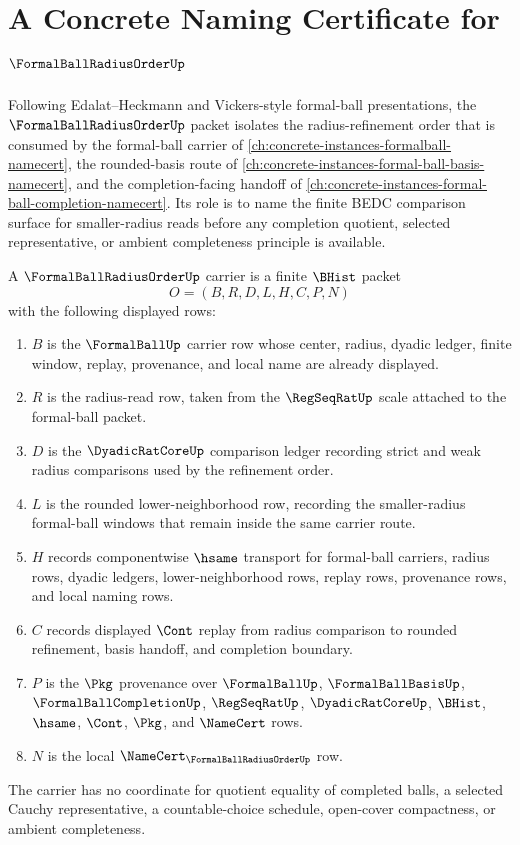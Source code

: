 \chapter{A Concrete Naming Certificate for $\FormalBallRadiusOrderUp$}
\label{ch:concrete-instances-formal-ball-radius-order-namecert}

Following Edalat--Heckmann and Vickers-style formal-ball presentations, the $\FormalBallRadiusOrderUp$ packet isolates the radius-refinement order that is consumed by the formal-ball carrier of \autoref{ch:concrete-instances-formalball-namecert}, the rounded-basis route of \autoref{ch:concrete-instances-formal-ball-basis-namecert}, and the completion-facing handoff of \autoref{ch:concrete-instances-formal-ball-completion-namecert}. Its role is to name the finite BEDC comparison surface for smaller-radius reads before any completion quotient, selected representative, or ambient completeness principle is available.

\begin{definition}
\label{def:formal-ball-radius-order}
A $\FormalBallRadiusOrderUp$ carrier is a finite $\BHist$ packet
$$
O=(B,R,D,L,H,C,P,N)
$$
with the following displayed rows:
\begin{enumerate}
\item $B$ is the $\FormalBallUp$ carrier row whose center, radius, dyadic ledger, finite window, replay, provenance, and local name are already displayed.
\item $R$ is the radius-read row, taken from the $\RegSeqRatUp$ scale attached to the formal-ball packet.
\item $D$ is the $\DyadicRatCoreUp$ comparison ledger recording strict and weak radius comparisons used by the refinement order.
\item $L$ is the rounded lower-neighborhood row, recording the smaller-radius formal-ball windows that remain inside the same carrier route.
\item $H$ records componentwise $\hsame$ transport for formal-ball carriers, radius rows, dyadic ledgers, lower-neighborhood rows, replay rows, provenance rows, and local naming rows.
\item $C$ records displayed $\Cont$ replay from radius comparison to rounded refinement, basis handoff, and completion boundary.
\item $P$ is the $\Pkg$ provenance over $\FormalBallUp$, $\FormalBallBasisUp$, $\FormalBallCompletionUp$, $\RegSeqRatUp$, $\DyadicRatCoreUp$, $\BHist$, $\hsame$, $\Cont$, $\Pkg$, and $\NameCert$ rows.
\item $N$ is the local $\NameCert_{\FormalBallRadiusOrderUp}$ row.
\end{enumerate}
The carrier has no coordinate for quotient equality of completed balls, a selected Cauchy representative, a countable-choice schedule, open-cover compactness, or ambient completeness.
\end{definition}

